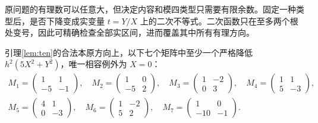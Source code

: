 原问题的有理数可以任意大，但决定内容和模四类型只需要有限余数。固定一种类型后，是否下降变成实变量 $t=Y/X$ 上的二次不等式。二次函数只在至多两个根处变号，因此可精确检查全部实区间，进而覆盖其中所有有理方向。
\begin{proposition}[十元二次覆盖证书]\label{prop:ten-certificate}
引理\ref{lem:ten}的合法本原方向上，以下七个矩阵中至少一个严格降低 $h^2(5X^2+Y^2)$，唯一相容例外为 $X=0$：
\[
\begin{gathered}
M_1=\begin{pmatrix}1&1\\-5&-1\end{pmatrix},\quad
M_2=\begin{pmatrix}1&0\\-5&2\end{pmatrix},\quad
M_3=\begin{pmatrix}1&-2\\0&3\end{pmatrix},\quad
M_4=\begin{pmatrix}1&1\\5&-3\end{pmatrix},\\
M_5=\begin{pmatrix}4&1\\0&-3\end{pmatrix},\quad
M_6=\begin{pmatrix}1&-2\\5&2\end{pmatrix},\quad
M_7=\begin{pmatrix}1&0\\-10&-1\end{pmatrix}.
\end{gathered}
\]
\end{proposition}
